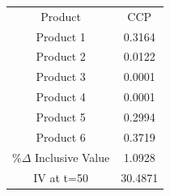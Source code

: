 \begin{tabular}{cc}
Product & CCP \\
Product 1 & 0.3164 \\
Product 2 & 0.0122 \\
Product 3 & 0.0001 \\
Product 4 & 0.0001 \\
Product 5 & 0.2994 \\
Product 6 & 0.3719 \\
$\%\Delta$ Inclusive Value & 1.0928 \\
IV at t=50 & 30.4871 \\
\end{tabular}